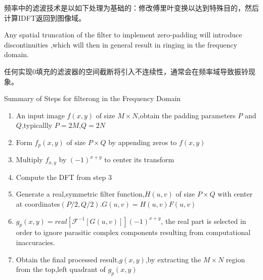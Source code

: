 \documentclass[12pt]{article}
\numberwithin{equation}{section}%
\begin{document}
频率中的滤波技术是以如下处理为基础的：修改傅里叶变换以达到特殊目的，然后计算IDFT返回到图像域。

Any spatial truncation of the filter to implement zero-padding will introduce discontinuities ,which will then in general result in ringing in the frequency domain.

任何实现0填充的滤波器的空间截断将引入不连续性，通常会在频率域导致振铃现象。

\begin{description}
\item [Summary of Steps for filterong in the Frequency Domain]
\end{description}

\begin{enumerate}
\item An input image $f(x,y)$ of size $M\times N$,obtain the padding parameters $P$ and $Q$,typicallly $P=2M$,$Q=2N$  

\item Form $f_{p}(x,y)$ of size $P\times Q$ by appending zeros to $f(x,y)$

\item Multiply $f_{x,y}$ by $(-1)^{x+y}$ to center its transform

\item Compute the DFT from step 3

\item Generate a real,symmetric filter function,$H(u,v)$ of size $P\times Q$ with center at coordinates$(P/2,Q/2)$.$G(u,v)=H(u,v)F(u,v)$

\item $g_{p}(x,y)={real[\mathscr{F}^{-1}[G(u,v)]]}(-1)^{x+y}$, the real part is selected in order to ignore parasitic complex components resulting from computational inaccuracies.

\item Obtain the final processed result,$g(x,y)$,by extracting the $M\times N$ region from the top,left quadrant of $g_{p}(x,y)$ 


\end{enumerate}
\end{document}
